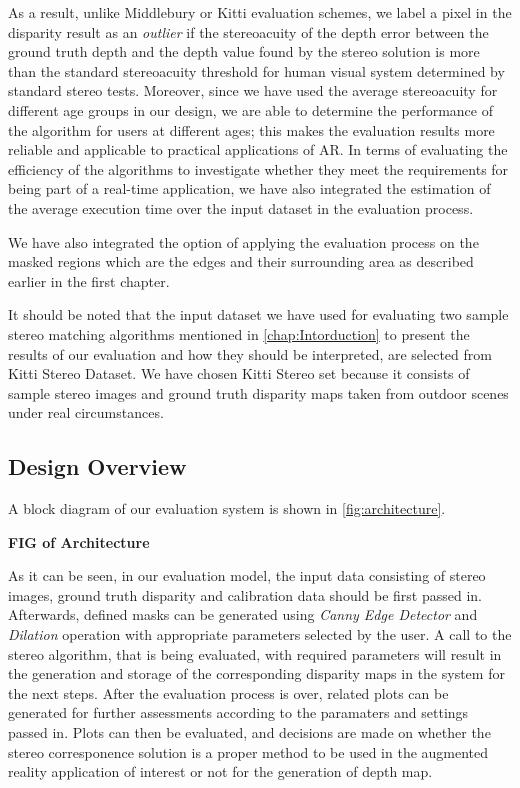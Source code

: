 As a result, unlike Middlebury or Kitti evaluation schemes, we label a pixel in the disparity result as an \textit{outlier} if the stereoacuity
of the depth error between the ground truth depth and the depth value found by the stereo solution is more than the standard stereoacuity threshold for human visual system determined
by standard stereo tests. 
Moreover, since we have used the average stereoacuity for different age groups \cite{garn06} in our design, we are able to determine the performance of the algorithm for users 
at different ages; this
makes the evaluation results more reliable and applicable to practical applications of AR.
In terms of evaluating the efficiency of the algorithms to investigate whether they meet the requirements for being part of a real-time application, 
we have also integrated the estimation of the average execution time over the input dataset in the evaluation process.

We have also integrated the option of applying the evaluation process on the masked regions which are the edges and their surrounding area as described earlier in the first chapter.

It should be noted that the input dataset we have used for evaluating two sample stereo matching algorithms mentioned in \ref{chap:Intorduction}
to present the results of our evaluation and how they should be interpreted, 
are selected from Kitti Stereo Dataset.
We have chosen Kitti Stereo set because it consists of sample stereo images and ground truth disparity maps
taken from outdoor scenes under real circumstances.

\subsection{Design Overview}
A block diagram of our evaluation system is shown in \ref{fig:architecture}.

\textbf{FIG of Architecture}

As it can be seen, in our evaluation model, the input data consisting of stereo images, ground truth disparity and calibration data should be first passed in. 
Afterwards, defined masks can be generated using \textit{Canny Edge Detector} and \textit{Dilation} operation with appropriate parameters selected by the user.
A call to the stereo algorithm, that is being evaluated, with required parameters will result in the generation and storage of the corresponding disparity maps
in the system for the next steps.
After the evaluation process is over, related plots can
be generated for further assessments according to the paramaters and settings passed in. Plots can then be evaluated, and decisions are made on 
whether the stereo corresponence solution is a proper method to be used in the augmented reality application of interest or not for the generation of depth map.

